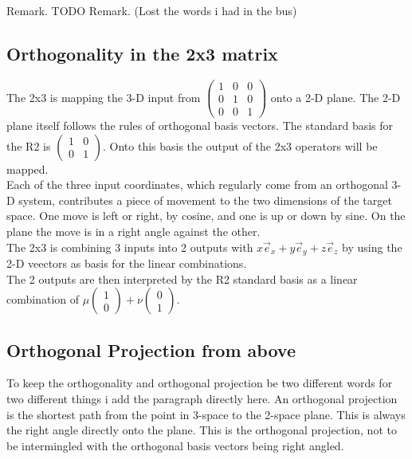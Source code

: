 \documentclass[a4paper]{article}
\begin{document}
\begin{PropositionOpt4}
Remark. TODO
Remark. (Lost the words i had in the bus)



\subsection{Orthogonality in the 2x3 matrix}


The 2x3 is mapping the 3-D input from $\begin{pmatrix}1&0&0\\0&1&0\\0&0&1\end{pmatrix}$ onto a 2-D plane. The 2-D plane itself follows the rules of orthogonal basis vectors. The standard basis for the R2 is $\begin{pmatrix}1&0\\0&1\end{pmatrix}$. Onto this basis the output of the 2x3 operators will be mapped.\\

Each of the three input coordinates, which regularly come from an orthogonal 3-D system, contributes a piece of movement to the two dimensions of the target space. One move is left or right, by cosine, and one is up or down by sine. On the plane the move is in a right angle against the other.\\

The 2x3 is combining 3 inputs into 2 outputs with $x\vec{e}_x + y\vec{e}_y + z\vec{e}_z$ by using the 2-D veectors as basis for the linear combinations.\\

The 2 outputs are then interpreted by the R2 standard basis as a linear combination of $\mu\begin{pmatrix}1\\0\end{pmatrix}+\nu\begin{pmatrix}0\\1\end{pmatrix}$.

\subsection{Orthogonal Projection from above}

To keep the orthogonality and orthogonal projection be two different words for two different things i add the paragraph directly here. An orthogonal projection is the shortest path from the point in 3-space to the 2-space plane. This is always the right angle directly onto the plane. This is the orthogonal projection, not to be intermingled with the orthogonal basis vectors being right angled. 


\end{PropositionOpt4}
\end{document}
